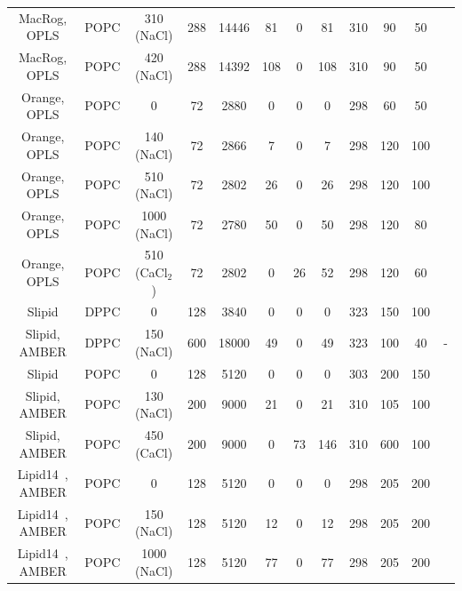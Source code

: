 \documentclass[pre,aps,floatfix,authordate1-4,twocolumn]{revtex4-1}
\begin{document}
\begin{table}[htb]
\begin{tabular}{c c c c c c c c c c c c}
  MacRog\cite{maciejewski14}, OPLS\cite{aqvist90}  & POPC &   310 (NaCl) & 288 & 14446 & 81 & 0 & 81 & 310 & 90&50  & \cite{macrogIONfiles} \\
  MacRog\cite{maciejewski14}, OPLS\cite{aqvist90}  & POPC &   420 (NaCl) & 288 & 14392 & 108 & 0 & 108 & 310 & 90& 50  & \cite{macrogIONfiles}  \\
  \hline
  Orange, OPLS\cite{aqvist90}  &   POPC & 0 & 72 & 2880 & 0 & 0  & 0 & 298 & 60 & 50 & \cite{orangePOPCfiles}  \\
  Orange, OPLS\cite{aqvist90} &   POPC & 140 (NaCl) & 72 & 2866 & 7 & 0  & 7 & 298 & 120 & 100 &\cite{orangePOPC140mMNaClfiles}  \\
  Orange, OPLS\cite{aqvist90}  &   POPC & 510 (NaCl) & 72 & 2802 & 26 & 0  & 26 & 298 & 120 & 100 &\cite{orangePOPC510mMNaClfiles}   \\
  Orange, OPLS\cite{aqvist90}  &   POPC & 1000 (NaCl) & 72 & 2780 & 50 & 0  & 50 & 298 & 120 & 80 & \cite{orangePOPC1000mMNaClfiles} \\
  Orange, OPLS &   POPC & 510 (CaCl$_2$)  & 72 & 2802 & 0 & 26  & 52 & 298 & 120 & 60 & \cite{orangePOPC510mMCaClfiles}  \\
  \hline
  Slipid\cite{jambeck12}   &   DPPC & 0 & 128 &3840 & 0 & 0  & 0 & 323 & 150 & 100 &~\cite{slipidsFILES}  \\
  Slipid\cite{jambeck12}, AMBER\cite{beglov94,roux96} &   DPPC & 150 (NaCl) & 600 & 18000 & 49 & 0  & 49 & 323 & 100 & 40 &-  \\
  \hline
  Slipid\cite{jambeck12b}   &   POPC & 0 & 128 & 5120 & 0 & 0  & 0 & 303 & 200 & 150 &~\cite{slipidsFILESpopc}  \\
  Slipid\cite{jambeck12b}, AMBER\cite{smith94}  &  POPC & 130 (NaCl) & 200 & 9000 & 21 & 0  & 21 & 310 & 105 & 100 &~\cite{slipidsFILESpopc130mMnaclSD}  \\
  Slipid\cite{jambeck12b}, AMBER\cite{kohagen14}  &  POPC & 450 (CaCl) & 200 & 9000  & 0 & 73  & 146 & 310 & 600 & 100 &~\cite{slipidsFILESpopc450mMcaclSCALED}  \\
  \hline
  Lipid14~\cite{dickson14}, AMBER\cite{aqvist90}  &   POPC & 0          & 128 & 5120 & 0 & 0  & 0 & 298 & 205 & 200 &~\cite{lipid14POPC0mMNaClfiles}  \\
  Lipid14~\cite{dickson14}, AMBER\cite{aqvist90}   &   POPC & 150 (NaCl) & 128 & 5120 & 12 & 0 & 12 & 298 & 205 & 200 &~\cite{lipid14POPC150mMNaClfiles}  \\
  Lipid14~\cite{dickson14}, AMBER\cite{aqvist90}   &   POPC & 1000 (NaCl) & 128 & 5120 & 77 & 0 & 77 & 298 & 205 & 200 &~\cite{lipid14POPC1000mMNaClfiles}  \\

\end{tabular}
\end{table}
\end{document}
